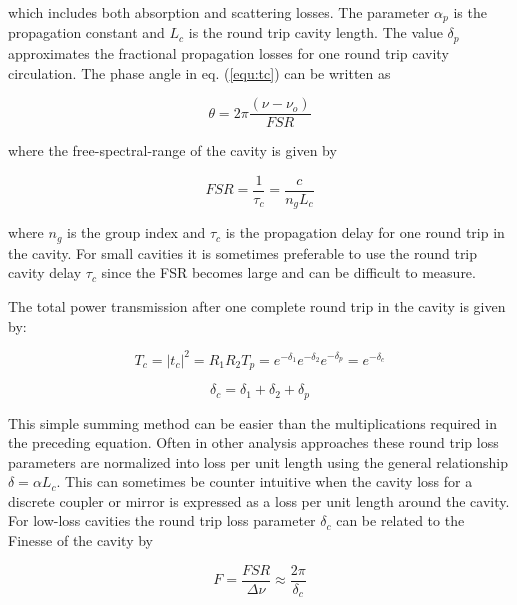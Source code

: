 \documentclass[10pt]{article}
\begin{document}
\noindent which includes both absorption and scattering losses. The parameter $\alpha_p$  is the propagation constant and $L_c$ is the round trip cavity length.    The value $\delta_{p}$  approximates the fractional propagation losses for one round trip cavity circulation.  The phase angle in eq.  (\ref{equ:tc}) can be written as

\begin{equation} 
\theta = 2\pi \frac{ (\nu - \nu_o)}{FSR}  
\end{equation}  

\noindent where the free-spectral-range of the cavity is given by

\begin{equation} 
FSR = \frac{1}{\tau_c}  = \frac{c}{n_g L_c}
\end{equation}  

\noindent   where  $n_g$ is the group index and $\tau_c$ is the propagation delay for one round trip in the cavity.   For small cavities it is sometimes preferable to use the round trip cavity delay $\tau_c$ since the FSR becomes large and can be difficult to measure. 

The total power transmission after one complete round trip in the cavity is given by:

\begin{equation}
  T_c = |t_c|^2 = R_1 R_2 T_p  = e^{-\delta_1} e^{-\delta_2} e^{-\delta_p} = e^{-\delta_c}
\end{equation}



\begin{equation} 
  \delta_c = \delta_1 + \delta_2 + \delta_p 
\end{equation} 

\noindent  This simple summing method can be easier than the multiplications  required in the preceding equation.  Often in other analysis approaches these round trip loss parameters are normalized into loss per unit length using the general relationship $\delta = \alpha L_c $.  This can sometimes be counter intuitive when the cavity loss for a discrete coupler or mirror is expressed as a loss per unit length around the cavity.   For low-loss cavities the round trip loss parameter $\delta_c$ can be related to  the Finesse of the cavity by 

\begin{equation} 
F = \frac{FSR}{\Delta\nu}  \approx \frac{2\pi}{\delta_c} 
\label{eq:F}
\end{equation}  
\end{document}
